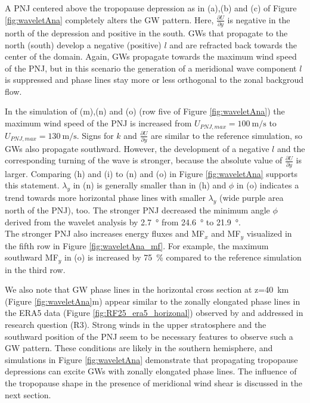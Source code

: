 A PNJ centered above the tropopause depression as in (a),(b) and (c) of Figure \ref{fig:waveletAna} completely alters the GW pattern. Here, $\frac{\partial U}{\partial y}$ is negative in the north of the depression and positive in the south. GWs that propagate to the north (south) develop a negative (positive) $l$ and are refracted back towards the center of the domain. Again, GWs propagate towards the maximum wind speed of the PNJ, but in this scenario the generation of a meridional wave component $l$ is suppressed and phase lines stay more or less orthogonal to the zonal backgroud flow.

In the simulation of (m),(n) and (o) (row five of Figure \ref{fig:waveletAna}) the maximum wind speed of the PNJ is increased from $U_{PNJ,max}=\SI{100}{\meter\per\second}$ to $U_{PNJ,max}=\SI{130}{\meter\per\second}$. Signs for $k$ and $\frac{\partial U}{\partial y}$ are similar to the reference simulation, so GWs also propagate southward. However, the development of a negative $l$ and the corresponding turning of the wave is stronger, because the absolute value of $\frac{\partial U}{\partial y}$ is larger. Comparing (h) and (i) to (n) and (o) in Figure \ref{fig:waveletAna} supports this statement. $\lambda_y$ in (n) is generally smaller than in (h) and $\phi$ in (o) indicates a trend towards more horizontal phase lines with smaller $\lambda_y$ (wide purple area north of the PNJ), too. The stronger PNJ decreased the minimum angle $\phi$ derived from the wavelet analysis by \SI{2.7}{\degree} from \SI{24.6}{\degree} to \SI{21.9}{\degree}. \\
The stronger PNJ also increases energy fluxes and MF$_x$ and MF$_y$ visualized in the fifth row in Figure \ref{fig:waveletAna_mf}. For example, the maximum southward MF$_y$ in (o) is increased by \SI{75}{\percent} compared to the reference simulation in the third row.

We also note that GW phase lines in the horizontal cross section at z=\SI{40}{\kilo\meter} (Figure \ref{fig:waveletAna}m) appear similar to the zonally elongated phase lines in the ERA5 data (Figure \ref{fig:RF25_era5_horizonal}) observed by \textcite[]{dornbrack_stratospheric_2022} and addressed in research question (R3). Strong winds in the upper stratosphere and the southward position of the PNJ seem to be necessary features to observe such a GW pattern. These conditions are likely in the southern hemisphere, and simulations in Figure \ref{fig:waveletAna} demonstrate that propagating tropopause depressions can excite GWs with zonally elongated phase lines. The influence of the tropopause shape in the presence of meridional wind shear is discussed in the next section.

